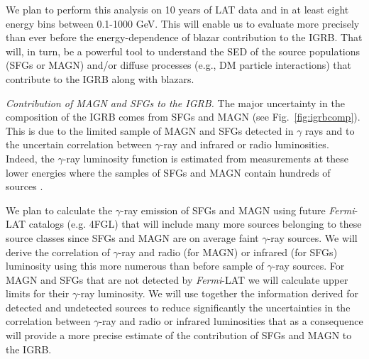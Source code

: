 \documentclass[12 pt]{article}
\begin{document}
We plan to perform this analysis on 10 years of LAT data and in at least eight energy bins between 0.1-1000 GeV. This will enable us to evaluate more precisely than ever before the energy-dependence of blazar contribution to the IGRB.  That will, in turn, be a powerful tool to understand the SED of the source populations (SFGs or MAGN) and/or diffuse processes (e.g., DM particle interactions) that contribute to the IGRB along with blazars.









{\it Contribution of MAGN and SFGs to the IGRB.}
The major uncertainty in the composition of the IGRB comes from SFGs and MAGN \cite{DiMauro:2015tfa} (see Fig.~\ref{fig:igrbcomp}). 
This is due to the limited sample of MAGN and SFGs detected in $\gamma$ rays and to the uncertain correlation between $\gamma$-ray and infrared or radio luminosities.
Indeed, the $\gamma$-ray luminosity function is estimated from measurements at these lower energies where the samples of SFGs and MAGN contain hundreds of sources \cite{2012ApJ...755..164A,DiMauro:2013xta}.


We plan to calculate the $\gamma$-ray emission of SFGs and MAGN using future {\it Fermi}-LAT catalogs (e.g. 4FGL) that will include many more sources belonging to these source classes since SFGs and MAGN are on average faint $\gamma$-ray sources.
We will derive the correlation of $\gamma$-ray and radio (for MAGN) or infrared (for SFGs) luminosity using this more numerous than before sample of $\gamma$-ray sources.
For MAGN and SFGs that are not detected by {\it Fermi}-LAT we will calculate upper limits for their $\gamma$-ray luminosity.
We will use together the information derived for detected and undetected sources to reduce significantly the uncertainties in the correlation between $\gamma$-ray and radio or infrared luminosities that as a consequence will provide a more precise estimate of the contribution of SFGs and MAGN to the IGRB.
\end{document}
